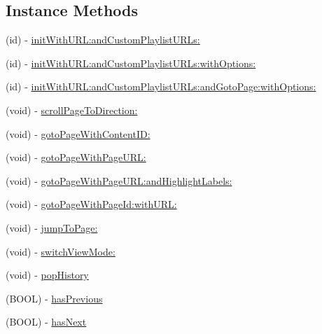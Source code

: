 \subsection*{Instance Methods}
\begin{DoxyCompactItemize}
\item 
(id) -\/ \hyperlink{interface_pxe_player_page_view_controller_a15e65a86dea35012359faacb38a052f8}{init\-With\-U\-R\-L\-:and\-Custom\-Playlist\-U\-R\-Ls\-:}
\item 
(id) -\/ \hyperlink{interface_pxe_player_page_view_controller_a150d11a91f41f65c2ffd52da4fa2f9a5}{init\-With\-U\-R\-L\-:and\-Custom\-Playlist\-U\-R\-Ls\-:with\-Options\-:}
\item 
(id) -\/ \hyperlink{interface_pxe_player_page_view_controller_a38fb0bb294f187bb8dc81dbe21dacc0a}{init\-With\-U\-R\-L\-:and\-Custom\-Playlist\-U\-R\-Ls\-:and\-Goto\-Page\-:with\-Options\-:}
\item 
(void) -\/ \hyperlink{interface_pxe_player_page_view_controller_a40badd98cae44b3d03c20ec165fd773f}{scroll\-Page\-To\-Direction\-:}
\item 
(void) -\/ \hyperlink{interface_pxe_player_page_view_controller_a31022922e291d882cc1bcf6d72f267fe}{goto\-Page\-With\-Content\-I\-D\-:}
\item 
(void) -\/ \hyperlink{interface_pxe_player_page_view_controller_a0e1cda32a90e77d3383f53329100e22f}{goto\-Page\-With\-Page\-U\-R\-L\-:}
\item 
(void) -\/ \hyperlink{interface_pxe_player_page_view_controller_aa2cb3d55fb9db0d8f1e7b76b071016d0}{goto\-Page\-With\-Page\-U\-R\-L\-:and\-Highlight\-Labels\-:}
\item 
(void) -\/ \hyperlink{interface_pxe_player_page_view_controller_ad0f33745ff3ff26d40bd8f0e62058ace}{goto\-Page\-With\-Page\-Id\-:with\-U\-R\-L\-:}
\item 
(void) -\/ \hyperlink{interface_pxe_player_page_view_controller_ad94e55ba622c0c1f455f3eb025ab3d90}{jump\-To\-Page\-:}
\item 
(void) -\/ \hyperlink{interface_pxe_player_page_view_controller_a8b9ce2b2307483d7c2b485afa0621a15}{switch\-View\-Mode\-:}
\item 
(void) -\/ \hyperlink{interface_pxe_player_page_view_controller_a8bff4c9f6e912f14863b8fa9f7566910}{pop\-History}
\item 
(B\-O\-O\-L) -\/ \hyperlink{interface_pxe_player_page_view_controller_a74be84589bce81321372227d27cea5b9}{has\-Previous}
\item 
(B\-O\-O\-L) -\/ \hyperlink{interface_pxe_player_page_view_controller_ab7e8d7fae4dcf5f87529e4468e5ad287}{has\-Next}

\end{DoxyCompactItemize}
